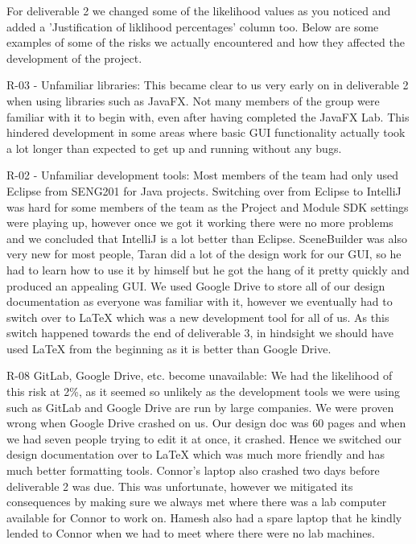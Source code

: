 For deliverable 2 we changed some of the likelihood values as you noticed and added a 'Justification of liklihood percentages' column too. Below are some examples of some of the risks we actually encountered and how they affected the development of the project.

R-03 - Unfamiliar libraries: This became clear to us very early on in deliverable 2 when using libraries such as JavaFX. Not many members of the group were familiar with it to begin with, even after having completed the JavaFX Lab. This hindered development in some areas where basic GUI functionality actually took a lot longer than expected to get up and running without any bugs.

R-02 - Unfamiliar development tools: Most members of the team had only used Eclipse from SENG201 for Java projects. Switching over from Eclipse to IntelliJ was hard for some members of the team as the Project and Module SDK settings were playing up, however once we got it working there were no more problems and we concluded that IntelliJ is a lot better than Eclipse.
SceneBuilder was also very new for most people, Taran did a lot of the design work for our GUI, so he had to learn how to use it by himself but he got the hang of it pretty quickly and produced an appealing GUI.
We used Google Drive to store all of our design documentation as everyone was familiar with it, however we eventually had to switch over to LaTeX which was a new development tool for all of us. As this switch happened towards the end of deliverable 3, in hindsight we should have used LaTeX from the beginning as it is better than Google Drive.

R-08 GitLab, Google Drive, etc. become unavailable: We had the likelihood of this risk at 2\%, as it seemed so unlikely as the development tools we were using such as GitLab and Google Drive are run by large companies. We were proven wrong when Google Drive crashed on us. Our design doc was 60 pages and when we had seven people trying to edit it at once, it crashed. Hence we switched our design documentation over to LaTeX which was much more friendly and has much better formatting tools.
Connor's laptop also crashed two days before deliverable 2 was due. This was unfortunate, however we mitigated its consequences by making sure we always met where there was a lab computer available for Connor to work on. Hamesh also had a spare laptop that he kindly lended to Connor when we had to meet where there were no lab machines.